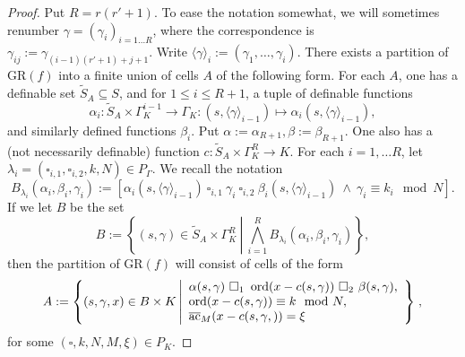 \begin{proof}
Put $R = r(r'+1)$. To ease the notation somewhat, we will sometimes renumber $\gamma =(\gamma_i)_{i=1\ldots R}$, where the correspondence is $\gamma_{ij}:= \gamma_{(i-1)(r'+1)+j+1}$.
Write $\langle \gamma\rangle_i := (\gamma_1, \ldots, \gamma_{i})$.
There exists a partition of $\text{GR}(f)$ into a finite union of cells $A$ of the following form. 
For each $A$, one has a definable set $\tilde{S}_A \subseteq S$, and for $1 \leqslant i \leqslant R+1$, a tuple of definable functions
\[\alpha_i: \tilde{S}_A \times \Gamma_K^{i-1} \to \Gamma_K: (s, \langle \gamma\rangle_{i-1}) \mapsto \alpha_i(s, \langle \gamma\rangle_{i-1}),\]
and similarly defined functions $\beta_i$. Put $\alpha := \alpha_{R+1}, \beta:= \beta_{R+1}$.  One also has a (not necessarily definable) function $c: \tilde{S}_A \times \Gamma_K^{R}\to K$.
For each $i =1, \ldots R$, let $\lambda_i =(\square_{i,1}, \square_{i,2},k,N) \in P_{\Gamma}$. We recall the notation 
\[
B_{\lambda_i}(\alpha_i,\beta_i,\gamma_i):=  [\alpha_i(s,\langle \gamma\rangle_{i-1})\ \square_{i,1} \ \gamma_i \ \square_{i,2} \ \beta_i(s,\langle \gamma\rangle_{i-1}) \ \wedge \
 \gamma_i \equiv k_i\mod N] .
\]
If we let $B$ be the set \[
B:= \left\{(s,\gamma) \in \tilde{S}_A \times \Gamma_K^R \ \left| \ \bigwedge_{i=1}^R B_{\lambda_i}(\alpha_i,\beta_i,\gamma_i)\right\}\right.,\]
then the partition of $\text{GR}(f)$ will consist of cells of the form
\[A:=\left\{(s, \gamma, x) \in B \times K \left| \begin{array}{l} 
\alpha(s,\gamma) \ \square_{1}\ \ord(x -c(s,\gamma)) \ \square_{2}\ \beta(s, \gamma),\\
\ord(x -c(s,\gamma)) \equiv k \mod N,\\ \ac_M(x -c(s,\gamma, )) = \xi
\end{array}
\right\}\right.,\]
for some $(\square, k, N, M, \xi) \in P_K$.


\end{proof}
